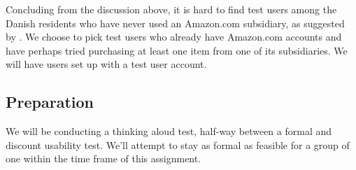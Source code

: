 Concluding from the discussion above, it is hard to find test users among the
Danish residents who have never used an Amazon.com subsidiary, as suggested by
\cite{molich}. We choose to pick test users who already have Amazon.com
accounts and have perhaps tried purchasing at least one item from one of its
subsidiaries. We will have users set up with a test user account.

















% 

\subsection{Preparation}

We will be conducting a thinking aloud test, half-way between a formal and
discount usability test. We'll attempt to stay as formal as feasible for a
group of one within the time frame of this assignment.

